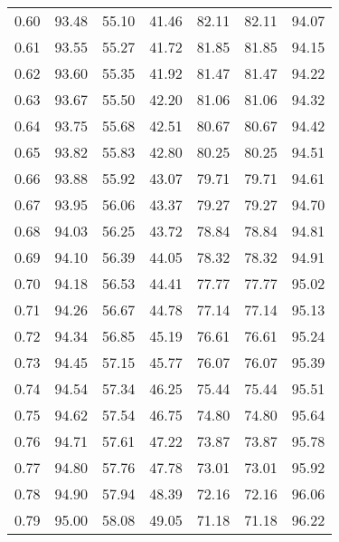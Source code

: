 \begin{tabular}{|c|c|c|c|c|c|c|}
      0.60 &     93.48 &     55.10 &      41.46 &   82.11 &      82.11 &         94.07 \\
      0.61 &     93.55 &     55.27 &      41.72 &   81.85 &      81.85 &         94.15 \\
      0.62 &     93.60 &     55.35 &      41.92 &   81.47 &      81.47 &         94.22 \\
      0.63 &     93.67 &     55.50 &      42.20 &   81.06 &      81.06 &         94.32 \\
      0.64 &     93.75 &     55.68 &      42.51 &   80.67 &      80.67 &         94.42 \\
      0.65 &     93.82 &     55.83 &      42.80 &   80.25 &      80.25 &         94.51 \\
      0.66 &     93.88 &     55.92 &      43.07 &   79.71 &      79.71 &         94.61 \\
      0.67 &     93.95 &     56.06 &      43.37 &   79.27 &      79.27 &         94.70 \\
      0.68 &     94.03 &     56.25 &      43.72 &   78.84 &      78.84 &         94.81 \\
      0.69 &     94.10 &     56.39 &      44.05 &   78.32 &      78.32 &         94.91 \\
      0.70 &     94.18 &     56.53 &      44.41 &   77.77 &      77.77 &         95.02 \\
      0.71 &     94.26 &     56.67 &      44.78 &   77.14 &      77.14 &         95.13 \\
      0.72 &     94.34 &     56.85 &      45.19 &   76.61 &      76.61 &         95.24 \\
      0.73 &     94.45 &     57.15 &      45.77 &   76.07 &      76.07 &         95.39 \\
      0.74 &     94.54 &     57.34 &      46.25 &   75.44 &      75.44 &         95.51 \\
      0.75 &     94.62 &     57.54 &      46.75 &   74.80 &      74.80 &         95.64 \\
      0.76 &     94.71 &     57.61 &      47.22 &   73.87 &      73.87 &         95.78 \\
      0.77 &     94.80 &     57.76 &      47.78 &   73.01 &      73.01 &         95.92 \\
      0.78 &     94.90 &     57.94 &      48.39 &   72.16 &      72.16 &         96.06 \\
      0.79 &     95.00 &     58.08 &      49.05 &   71.18 &      71.18 &         96.22 \\

\end{tabular}
